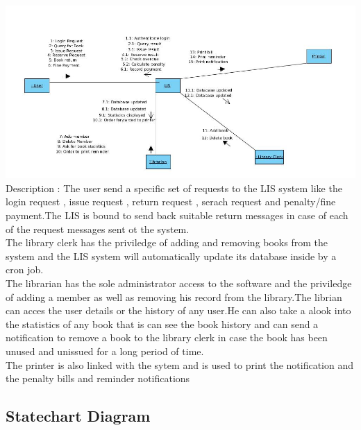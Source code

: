 \documentclass[a4paper]{article}
\begin{document}
\includegraphics[scale=0.50]{images/collaDiag.jpg}
\\
Description : The user send a specific set of requests to the LIS system like the login request , issue request , return request , serach request and penalty/fine payment.The LIS is bound to send back suitable return messages in case of each of the request messages sent ot the system.
\\
The library clerk has the priviledge of adding and removing books from the system and the LIS system will automatically update its database inside by a cron job.
\\
The librarian has the sole administrator access to the software and the priviledge of adding a member as well as removing his record from the library.The librian can acces the user details or the history of any user.He can also take a alook into the statistics of any book that is can see the book history and can send a notification to remove a book to the library clerk in case the book has been unused and unissued for a long period of time.
\\
The printer is also linked with the sytem and is used to print the notification and the penalty bills and reminder notifications

\subsection{Statechart Diagram}
\end{document}
